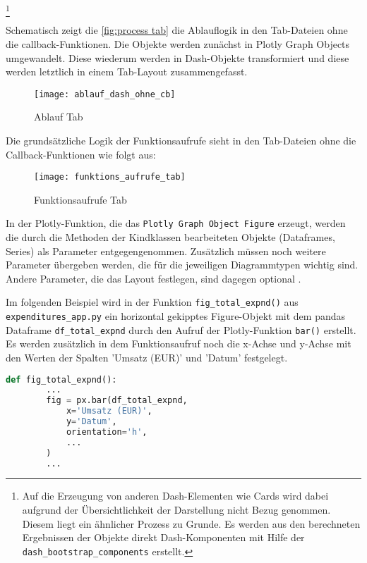     \footnote{Auf die Erzeugung von anderen Dash-Elementen wie Cards wird dabei aufgrund der Übersichtlichkeit der Darstellung nicht Bezug genommen. Diesem liegt ein ähnlicher Prozess
    zu Grunde. Es werden aus den berechneten Ergebnissen der Objekte direkt Dash-Komponenten mit Hilfe der \texttt{dash\_bootstrap\_components} erstellt.}
    
    Schematisch zeigt die \autoref{fig:process tab} die Ablauflogik in den Tab-Dateien ohne die callback-Funktionen.
    Die Objekte werden zunächst in Plotly Graph Objects umgewandelt. Diese wiederum werden in Dash-Objekte transformiert und diese werden 
    letztlich in einem Tab-Layout zusammengefasst.
    
    \begin{figure}[H]
        \centering
            \texttt{[image: ablauf\_dash\_ohne\_cb]}
            \caption{Ablauf Tab}
            \label{fig:process tab}
    \end{figure}

    Die grundsätzliche Logik der Funktionsaufrufe sieht in den Tab-Dateien ohne die Callback-Funktionen wie folgt aus:


    \begin{figure}[H]
        \centering
            \texttt{[image: funktions\_aufrufe\_tab]}
            \caption{Funktionsaufrufe Tab}
            \label{fig:function call tab}
    \end{figure}

    In der Plotly-Funktion, die das \texttt{Plotly Graph Object Figure} erzeugt, werden die durch die Methoden der Kindklassen bearbeiteten Objekte (Dataframes, Series) 
    als Parameter entgegengenommen. Zusätzlich müssen noch weitere Parameter übergeben werden, die für die jeweiligen Diagrammtypen wichtig sind.
    Andere Parameter, die das Layout festlegen, sind dagegen optional \cite[vgl.][]{plotly_plotlygraph_objectsbar_2021}.
    
    Im folgenden Beispiel wird in der Funktion \texttt{fig\_total\_expnd()} aus \texttt{expenditures\_app.py} ein horizontal gekipptes Figure-Objekt
    mit dem pandas Dataframe \texttt{df\_total\_expnd} durch den Aufruf der Plotly-Funktion \texttt{bar()} erstellt. 
    Es werden zusätzlich in dem Funktionsaufruf noch die x-Achse und y-Achse mit den Werten der Spalten 'Umsatz (EUR)' und 'Datum' festgelegt. 

    \begin{lstlisting}[language=Python, caption=Funktion fig\_total\_expnd() Auszug 1]
    def fig_total_expnd():
        ...
        fig = px.bar(df_total_expnd,
            x='Umsatz (EUR)',
            y='Datum',
            orientation='h',
            ...
        )
        ...
    \end{lstlisting}
    
